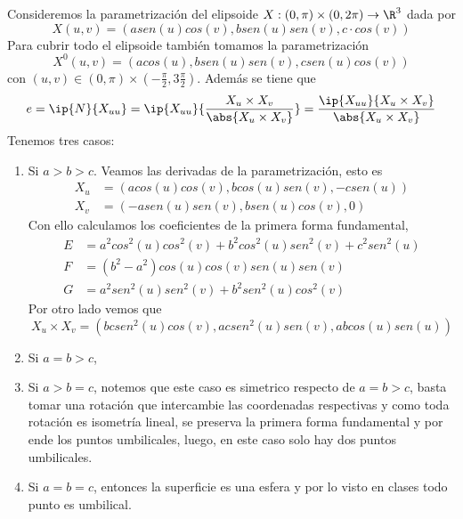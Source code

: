 \documentclass{article}
\begin{document}
\noindent Consideremos la parametrización del elipsoide $X:(0,\pi)\times(0,2\pi)\to\R^{3}$ dada por
\begin{equation*}
    X(u,v)=(asen(u)cos(v),bsen(u)sen(v),c\cdot cos(v))
\end{equation*}
Para cubrir todo el elipsoide también tomamos la parametrización
\begin{equation*}
    X^{0}(u,v)=(acos(u), bsen(u)sen(v),csen(u)cos(v))
\end{equation*}
con $(u,v)\in(0,\pi)\times(-\frac{\pi}{2},3\frac{\pi}{2})$. Además se tiene que
\begin{equation*}
    e=\ip{N}{X_{uu}}=\ip{X_{uu}}{\frac{X_{u}\times X_{v}}{\abs{X_{u}\times X_{v}}}}
    =\frac{\ip{X_{uu}}{X_{u}\times X_{v}}}{\abs{X_{u}\times X_{v}}}
\end{equation*}
Tenemos tres casos:
\begin{enumerate}
    \item Si $a>b>c$. Veamos las derivadas de la parametrización, esto es
    \begin{align*}
        X_{u} &= (acos(u)cos(v),bcos(u)sen(v),-csen(u)) \\
        X_{v} &= (-asen(u)sen(v),bsen(u)cos(v),0)
    \end{align*}
    Con ello calculamos los coeficientes de la primera forma fundamental,
    \begin{align*}
        E &= a^{2}cos^{2}(u)cos^{2}(v)+b^{2}cos^{2}(u)sen^{2}(v)+c^{2}sen^{2}(u) \\
        F &= (b^{2}-a^{2})cos(u)cos(v)sen(u)sen(v) \\
        G &= a^{2}sen^{2}(u)sen^{2}(v)+b^{2}sen^{2}(u)cos^{2}(v)
    \end{align*}
    Por otro lado vemos que
    \begin{equation*}
        X_{u}\times X_{v}=(bcsen^{2}(u)cos(v),acsen^{2}(u)sen(v),abcos(u)sen(u))
    \end{equation*}

    \item Si $a=b>c$,
    
    \item Si $a>b=c$, notemos que este caso es simetrico respecto de $a=b>c$, basta tomar una
    rotación que intercambie las coordenadas respectivas y como toda rotación es isometría lineal,
    se preserva la primera forma fundamental y por ende los puntos umbilicales, luego, en este caso
    solo hay dos puntos umbilicales.

    \item Si $a=b=c$, entonces la superficie es una esfera y por lo visto en clases todo punto es
    umbilical.
\end{enumerate}
\end{document}
